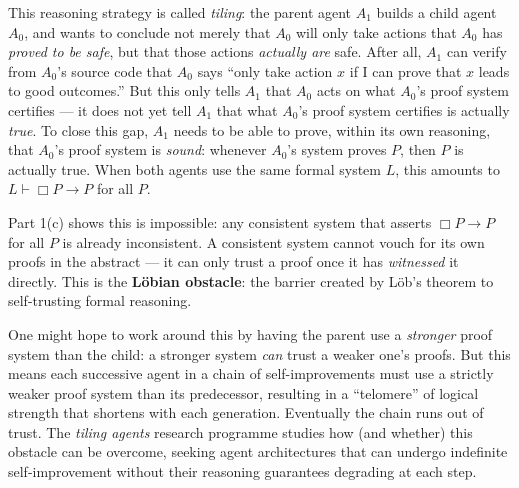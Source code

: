\documentclass[11pt]{article}
\begin{document}
\begin{exercise}
\medskip
\noindent
This reasoning strategy is called \emph{tiling}: the parent agent $A_1$ builds a
child agent $A_0$, and wants to conclude not merely that $A_0$ will only take actions
that $A_0$ has \emph{proved to be safe}, but that those actions \emph{actually are}
safe. After all, $A_1$ can verify from $A_0$'s source code that $A_0$ says ``only
take action $x$ if I can prove that $x$ leads to good outcomes.'' But this only tells
$A_1$ that $A_0$ acts on what $A_0$'s proof system certifies --- it does not yet tell
$A_1$ that what $A_0$'s proof system certifies is actually \emph{true}. To close this
gap, $A_1$ needs to be able to prove, within its own reasoning, that $A_0$'s proof
system is \emph{sound}: whenever $A_0$'s system proves $P$, then $P$ is actually
true. When both agents use the same formal system $L$, this amounts to
$L \vdash \Box P \to P$ for all $P$.

\medskip
\noindent
Part 1(c) shows this is impossible: any consistent system that asserts
$\Box P \to P$ for all $P$ is already inconsistent. A consistent system cannot vouch
for its own proofs in the abstract --- it can only trust a proof once it has
\emph{witnessed} it directly. This is the \textbf{L\"obian obstacle}: the barrier
created by L\"ob's theorem to self-trusting formal reasoning.

\medskip
\noindent
One might hope to work around this by having the parent use a \emph{stronger} proof
system than the child: a stronger system \emph{can} trust a weaker one's proofs. But
this means each successive agent in a chain of self-improvements must use a strictly
weaker proof system than its predecessor, resulting in a ``telomere'' of logical
strength that shortens with each generation. Eventually the chain runs out of trust.
The \emph{tiling agents} research programme studies how (and whether) this obstacle can
be overcome, seeking agent architectures that can undergo indefinite self-improvement
without their reasoning guarantees degrading at each step.
\end{exercise}
\end{document}
